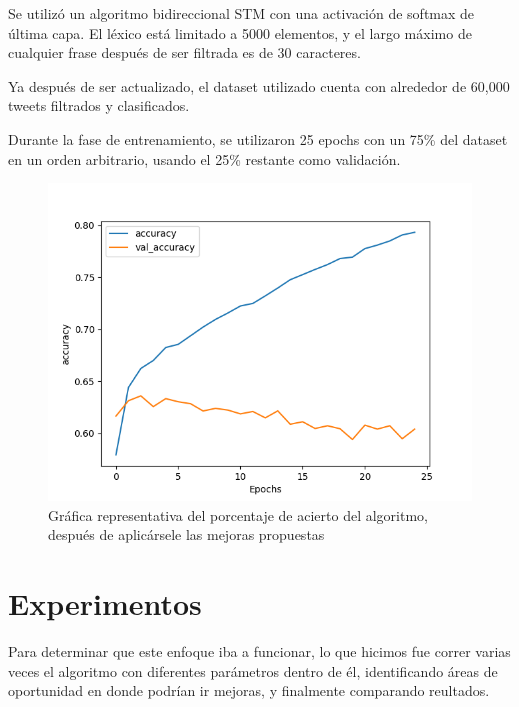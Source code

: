 \documentclass[a4]{sciposter}
\begin{document}
\begin{multicols}{2}
Se utilizó un algoritmo bidireccional STM con una activación de softmax de última capa. El léxico está limitado a 5000 elementos, y el largo máximo de cualquier frase después de ser filtrada es de 30 caracteres.

Ya después de ser actualizado, el dataset utilizado cuenta con alrededor de 60,000 tweets filtrados y clasificados.

Durante la fase de entrenamiento, se utilizaron 25 epochs con un 75\% del dataset en un orden arbitrario, usando el 25\% restante como validación.

\begin{figure}
	\centering
	\captionsetup{type=figure}
	\setcounter{figure}{1}
	\includegraphics[scale=1.5]{img/Accuracy 2021-07.png}
	\caption{Gráfica representativa del porcentaje de acierto del algoritmo, después de aplicársele las mejoras propuestas}	
\end{figure}

\section{Experimentos}

Para determinar que este enfoque iba a funcionar, lo que hicimos fue correr varias veces el algoritmo con diferentes parámetros dentro de él, identificando áreas de oportunidad en donde podrían ir mejoras, y finalmente comparando reultados.


\end{multicols}
\end{document}
